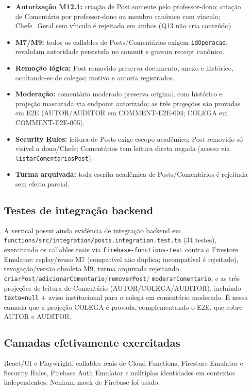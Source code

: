 \begin{itemize}
  \item \textbf{Autorização M12.1:} criação de Post somente pelo professor-dono;
    criação de Comentário por professor-dono ou membro canônico com vínculo;
    Chefe\_Geral sem vínculo é rejeitado em ambos (Q13 não cria conteúdo).
  \item \textbf{M7/M9:} todos os callables de Posts/Comentários exigem
    \texttt{idOperacao}, revalidam autoridade persistida no commit e gravam
    receipt canônico.
  \item \textbf{Remoção lógica:} Post removido preserva documento, anexo e
    histórico, ocultando-se de colegas; motivo e autoria registrados.
  \item \textbf{Moderação:} comentário moderado preserva original, com histórico
    e projeção mascarada via endpoint autorizado; as três projeções são provadas
    em E2E (AUTOR/AUDITOR em COMMENT-E2E-004; COLEGA em COMMENT-E2E-005).
  \item \textbf{Security Rules:} leitura de Posts exige escopo acadêmico; Post
    removido só visível a dono/Chefe; Comentários tem leitura direta negada
    (acesso via \texttt{listarComentariosPost}).
  \item \textbf{Turma arquivada:} toda escrita acadêmica de Posts/Comentários é
    rejeitada sem efeito parcial.
\end{itemize}

\subsection{Testes de integração backend}

A vertical possui ainda evidência de integração backend em
\texttt{functions/src/\allowbreak integration/posts.integration.test.ts} (34
testes), exercitando os callables reais via \texttt{firebase-functions-test}
contra o Firestore Emulator: replay/reuso M7 (compatível não duplica;
incompatível é rejeitado), revogação/versão obsoleta M9, turma arquivada
rejeitando \texttt{criarPost}/\texttt{adicionarComentario}/\texttt{removerPost}/
\texttt{moderarComentario}, e as três projeções de leitura de Comentário
(AUTOR/COLEGA/AUDITOR), incluindo \texttt{texto=null} + aviso institucional
para o colega em comentário moderado. É nessa camada que a projeção COLEGA é
provada, complementando o E2E, que cobre AUTOR e AUDITOR.

\subsection{Camadas efetivamente exercitadas}

React/UI e Playwright, callables reais de Cloud Functions, Firestore Emulator e
Security Rules, Firebase Auth Emulator e múltiplas identidades em contextos
independentes. Nenhum mock de Firebase foi usado.
